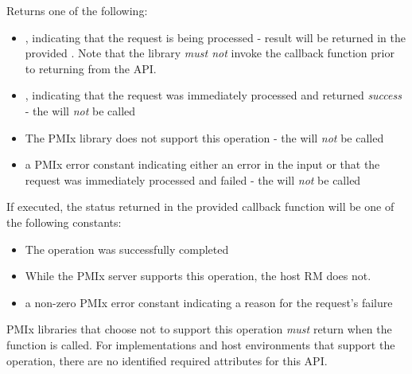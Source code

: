 \begin{arglist}
\end{arglist}

Returns one of the following:

\begin{itemize}
    \item {}, indicating that the request is being processed - result will be returned in the provided . Note that the library \emph{must not} invoke the callback function prior to returning from the \ac{API}.
    \item {}, indicating that the request was immediately processed and returned \textit{success} - the  will \textit{not} be called
    \item {} The \ac{PMIx} library does not support this operation - the  will \textit{not} be called
    \item a \ac{PMIx} error constant indicating either an error in the input or that the request was immediately processed and failed - the  will \textit{not} be called
\end{itemize}

If executed, the status returned in the provided callback function will be one of the following constants:

\begin{itemize}
\item {} The operation was successfully completed
\item {} While the \ac{PMIx} server supports this operation, the host \ac{RM} does not.
\item a non-zero \ac{PMIx} error constant indicating a reason for the request's failure
\end{itemize}

\reqattrstart
\ac{PMIx} libraries that choose not to support this operation \textit{must} return  when the function is called. For implementations and host environments that support the operation, there are no identified required
attributes for this \ac{API}.
\reqattrend

